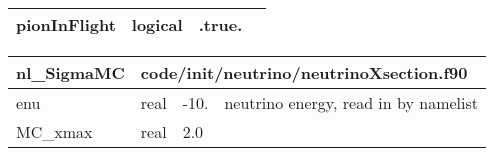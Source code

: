 \documentclass{article}
\begin{document}
\begin{longtable}{llll}
\midrule
pionInFlight & \begin{minipage}[t]{2cm}logical\end{minipage} & \begin{minipage}[t]{2cm}.true.\end{minipage} & \begin{minipage}[t]{12cm}\end{minipage}\\*
\bottomrule
\end{longtable}
{ }




\begin{longtable}{llll}
\toprule
\textbf{\large{nl\_SigmaMC}} & \multicolumn{3}{l}{\footnotesize{code/init/neutrino/neutrinoXsection.f90}}\\*
\midrule
\endfirsthead
\midrule
\endhead
enu & \begin{minipage}[t]{2cm}real\end{minipage} & \begin{minipage}[t]{2cm}-10.\end{minipage} & \begin{minipage}[t]{12cm}neutrino energy, read in by namelist\end{minipage}\\*
\midrule
MC\_xmax & \begin{minipage}[t]{2cm}real\end{minipage} & \begin{minipage}[t]{2cm}2.0\end{minipage} & \begin{minipage}[t]{12cm}\end{minipage}\\*
\bottomrule
\end{longtable}
{ }



\end{document}
